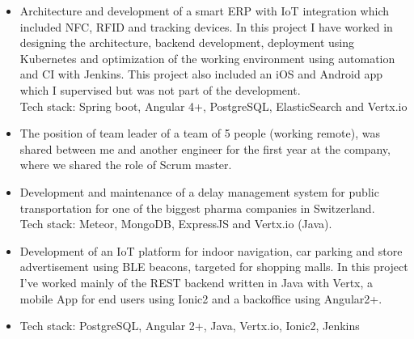 \documentclass[10pt,a4paper]{altacv}
\begin{document}

\begin{fullwidth}
\makecvheader
\end{fullwidth}


\begin{itemize}
\justifying
\item Architecture and development of a smart ERP with IoT integration which
  included NFC, RFID and tracking devices. In this project I have worked in
  designing the architecture, backend development, deployment using Kubernetes
  and optimization of the working environment using automation and CI with
  Jenkins. This project also included an iOS and Android app which I supervised
  but was not part of the development.
  \\Tech stack: Spring boot, Angular 4+, PostgreSQL, ElasticSearch and Vertx.io
\item The position of team leader of a team of 5 people (working remote), was
  shared between me and another engineer for the first year at the company, where we shared the role of Scrum master.
\item Development and maintenance of a delay management system for public
  transportation for one of the biggest pharma companies in Switzerland. \\Tech stack: Meteor, MongoDB,
  ExpressJS and Vertx.io (Java).  
\end{itemize} 

\divider

\begin{itemize}
\justifying 
\item Development of an IoT platform for indoor navigation, car parking and store advertisement using BLE beacons, targeted for shopping malls.
In this project I've worked mainly of the REST backend written in Java with Vertx, a mobile App for end users using Ionic2 and a backoffice using Angular2+.  
\item Tech stack: PostgreSQL, Angular 2+, Java, Vertx.io, Ionic2, Jenkins
\end{itemize}
\end{document}
